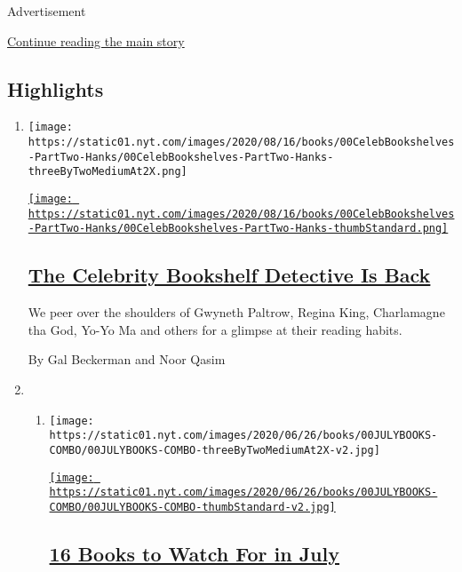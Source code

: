 Advertisement

\protect\hyperlink{after-subheader}{Continue reading the main story}

\hypertarget{highlights}{%
\subsection{Highlights}\label{highlights}}

\begin{enumerate}
\def\labelenumi{\arabic{enumi}.}
\item
  \texttt{[image: https://static01.nyt.com/images/2020/08/16/books/00CelebBookshelves-PartTwo-Hanks/00CelebBookshelves-PartTwo-Hanks-threeByTwoMediumAt2X.png]}

  \href{/2020/07/27/books/tom-hanks-gwyneth-paltrow-bookshelves.html}{\texttt{[image: https://static01.nyt.com/images/2020/08/16/books/00CelebBookshelves-PartTwo-Hanks/00CelebBookshelves-PartTwo-Hanks-thumbStandard.png]}}

  \hypertarget{the-celebrity-bookshelf-detective-is-back}{%
  \subsection{\texorpdfstring{\href{/2020/07/27/books/tom-hanks-gwyneth-paltrow-bookshelves.html}{The
  Celebrity Bookshelf Detective Is
  Back}}{The Celebrity Bookshelf Detective Is Back}}\label{the-celebrity-bookshelf-detective-is-back}}

  We peer over the shoulders of Gwyneth Paltrow, Regina King,
  Charlamagne tha God, Yo-Yo Ma and others for a glimpse at their
  reading habits.

  By Gal Beckerman and Noor Qasim
\item
  \begin{enumerate}
  \def\labelenumii{\arabic{enumii}.}
  \item
    \texttt{[image: https://static01.nyt.com/images/2020/06/26/books/00JULYBOOKS-COMBO/00JULYBOOKS-COMBO-threeByTwoMediumAt2X-v2.jpg]}

    \href{/2020/06/24/books/new-july-books.html}{\texttt{[image: https://static01.nyt.com/images/2020/06/26/books/00JULYBOOKS-COMBO/00JULYBOOKS-COMBO-thumbStandard-v2.jpg]}}

    \hypertarget{16-books-to-watch-for-in-july}{%
    \subsection{\texorpdfstring{\href{/2020/06/24/books/new-july-books.html}{16
    Books to Watch For in
    July}}{16 Books to Watch For in July}}\label{16-books-to-watch-for-in-july}}


\end{enumerate}
\end{enumerate}
